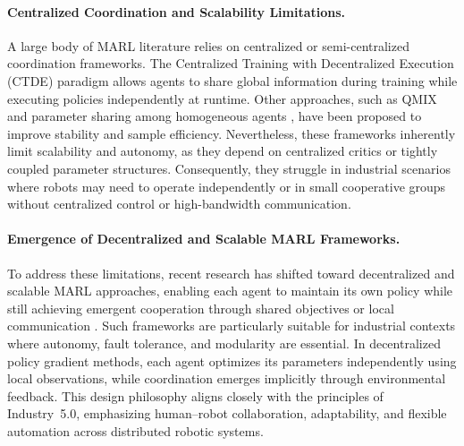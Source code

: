 \documentclass[english, 12pt, a4paper, elec, utf8, a-2b, online]{aaltothesis}
\begin{document}
\paragraph{Centralized Coordination and Scalability Limitations.}
A large body of MARL literature relies on centralized or semi-centralized coordination frameworks. The Centralized Training with Decentralized Execution (CTDE) paradigm \cite{lowe2017multi} allows agents to share global information during training while executing policies independently at runtime. Other approaches, such as QMIX \cite{rashid2020monotonic} and parameter sharing among homogeneous agents \cite{gupta2017cooperative}, have been proposed to improve stability and sample efficiency. Nevertheless, these frameworks inherently limit scalability and autonomy, as they depend on centralized critics or tightly coupled parameter structures. Consequently, they struggle in industrial scenarios where robots may need to operate independently or in small cooperative groups without centralized control or high-bandwidth communication.

\paragraph{Emergence of Decentralized and Scalable MARL Frameworks.}
To address these limitations, recent research has shifted toward decentralized and scalable MARL approaches, enabling each agent to maintain its own policy while still achieving emergent cooperation through shared objectives or local communication \cite{foerster2018counterfactual}. Such frameworks are particularly suitable for industrial contexts where autonomy, fault tolerance, and modularity are essential. In decentralized policy gradient methods, each agent optimizes its parameters independently using local observations, while coordination emerges implicitly through environmental feedback. This design philosophy aligns closely with the principles of Industry~5.0, emphasizing human–robot collaboration, adaptability, and flexible automation across distributed robotic systems.
\end{document}
